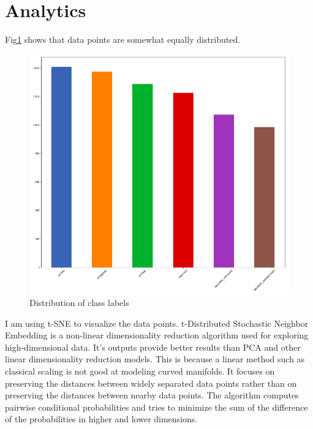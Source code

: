 \documentclass[12pt]{article}
\begin{document}
\section{Analytics}
Fig\ref{fig:dis} shows that data points are somewhat equally distributed.
\begin{figure}[H]
\centering
\includegraphics[scale=0.17]{dis.png}
\caption{Distribution of class labels}
\label{fig:dis}
\end{figure}\noindent
I am using t-SNE to visualize the data points. t-Distributed Stochastic Neighbor Embedding is a non-linear dimensionality reduction algorithm used for exploring high-dimensional data. It's outputs provide better results than PCA and other linear dimensionality reduction models. This is because a linear method such as classical scaling is not good at modeling curved manifolds. It focuses on preserving the distances between widely separated data points rather than on preserving the distances between nearby data points. The algorithm computes pairwise conditional probabilities and tries to minimize the sum of the difference of the probabilities in higher and lower dimensions. 
\end{document}
